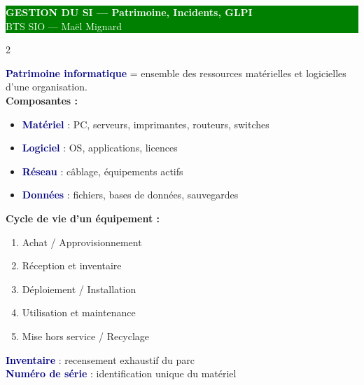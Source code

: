 \documentclass[a4paper,10pt]{article}
\newcommand{\key}[1]{\textbf{\textcolor{navy}{#1}}}
\begin{document}
\begin{center}
  \colorbox{green}{\parbox{\dimexpr\textwidth-2\fboxsep}{
    \centering\vspace{3pt}
    {\LARGE\bfseries\textcolor{white}{GESTION DU SI — Patrimoine, Incidents, GLPI}}\\
    {\normalsize\textcolor{white}{BTS SIO — Maël Mignard}}
    \vspace{3pt}
  }}
\end{center}
\vspace{6pt}

\begin{multicols}{2}

\begin{tcolorbox}[basebox, colframe=green, title=1. Gestion du Patrimoine Informatique]
\key{Patrimoine informatique} = ensemble des ressources matérielles et logicielles d'une organisation.\\[4pt]
\textbf{Composantes :}
\begin{itemize}
  \item \key{Matériel} : PC, serveurs, imprimantes, routeurs, switches
  \item \key{Logiciel} : OS, applications, licences
  \item \key{Réseau} : câblage, équipements actifs
  \item \key{Données} : fichiers, bases de données, sauvegardes
\end{itemize}
\vspace{4pt}
\textbf{Cycle de vie d'un équipement :}
\begin{enumerate}
  \item Achat / Approvisionnement
  \item Réception et inventaire
  \item Déploiement / Installation
  \item Utilisation et maintenance
  \item Mise hors service / Recyclage
\end{enumerate}
\vspace{4pt}
\key{Inventaire} : recensement exhaustif du parc \\
\key{Numéro de série} : identification unique du matériel
\end{tcolorbox}


\end{multicols}
\end{document}
